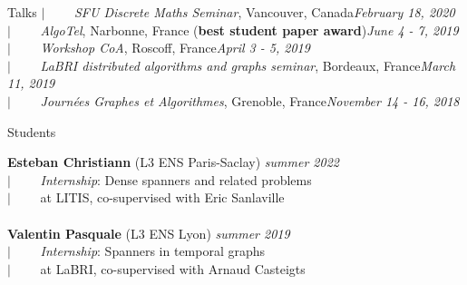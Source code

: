 \documentclass[french]{resume} %
\begin{document}
\begin{rSection}{Talks}
$| \qquad$ \textit{SFU Discrete Maths Seminar}, Vancouver, Canada\hfill {\em February 18, 2020} \\
$| \qquad$ \textit{AlgoTel}, Narbonne, France (\textbf{best student paper award})\hfill {\em June 4 - 7, 2019} \\
$| \qquad$ \textit{Workshop CoA}, Roscoff, France\hfill {\em April 3 - 5, 2019} \\
$| \qquad$ \textit{LaBRI distributed algorithms and graphs seminar}, Bordeaux, France\hfill {\em March 11, 2019} \\
$| \qquad$ \textit{Journées Graphes et Algorithmes}, Grenoble, France\hfill {\em November 14 - 16, 2018}
\end{rSection}

\begin{rSection}{Students}
	
{\bf Esteban Christiann} (L3 ENS Paris-Saclay) \hfill {\em summer 2022}
\\
$| \qquad$ \textit{Internship}: Dense spanners and related problems\\
$| \qquad$ at LITIS, co-supervised with Eric Sanlaville
\\ \\	
{\bf Valentin Pasquale} (L3 ENS Lyon) \hfill {\em summer 2019} 
\\
$| \qquad$ \textit{Internship}: Spanners in temporal graphs\\
$| \qquad$ at LaBRI, co-supervised with Arnaud Casteigts
\end{rSection}

%	
\end{document}
